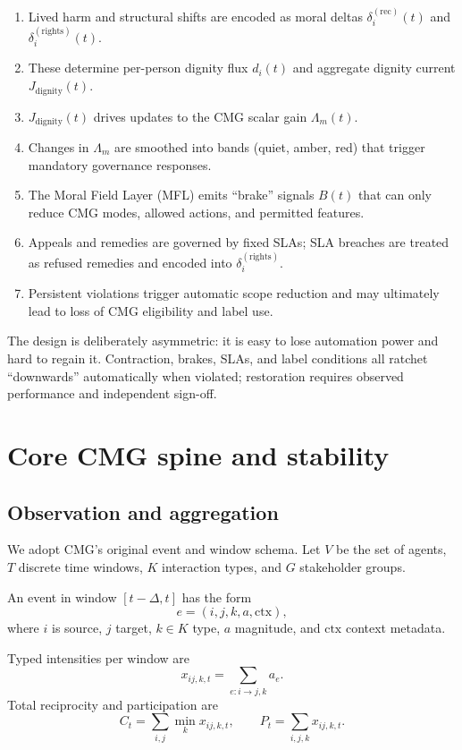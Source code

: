 \documentclass[11pt]{article}
\begin{document}
\begin{enumerate}[leftmargin=*]
  \item Lived harm and structural shifts are encoded as moral deltas \(\delta_i^{(\text{rec})}(t)\) and \(\delta_i^{(\text{rights})}(t)\).
  \item These determine per-person dignity flux \(d_i(t)\) and aggregate dignity current \(J_{\text{dignity}}(t)\).
  \item \(J_{\text{dignity}}(t)\) drives updates to the CMG scalar gain \(\Lambda_m(t)\).
  \item Changes in \(\Lambda_m\) are smoothed into bands (quiet, amber, red) that trigger mandatory governance responses.
  \item The Moral Field Layer (MFL) emits ``brake'' signals \(B(t)\) that can only reduce CMG modes, allowed actions, and permitted features.
  \item Appeals and remedies are governed by fixed SLAs; SLA breaches are treated as refused remedies and encoded into \(\delta_i^{(\text{rights})}\).
  \item Persistent violations trigger automatic scope reduction and may ultimately lead to loss of CMG eligibility and label use.
\end{enumerate}

The design is deliberately asymmetric: it is easy to lose automation power and hard to regain it.
Contraction, brakes, SLAs, and label conditions all ratchet ``downwards'' automatically when violated; restoration requires observed performance and independent sign-off.

\section{Core CMG spine and stability}

\subsection{Observation and aggregation}

We adopt CMG's original event and window schema.
Let \(V\) be the set of agents, \(T\) discrete time windows, \(K\) interaction types, and \(G\) stakeholder groups.\cite{cmg-spec}

An event in window \([t-\Delta, t]\) has the form
\[
e = (i,j,k,a,\text{ctx}),
\]
where \(i\) is source, \(j\) target, \(k \in K\) type, \(a\) magnitude, and \(\text{ctx}\) context metadata.

Typed intensities per window are
\[
x_{ij,k,t} = \sum_{e:i\to j,k} a_e.
\]
Total reciprocity and participation are
\[
C_t = \sum_{i,j} \min_k x_{ij,k,t}, \qquad
P_t = \sum_{i,j,k} x_{ij,k,t}.
\]
\end{document}
